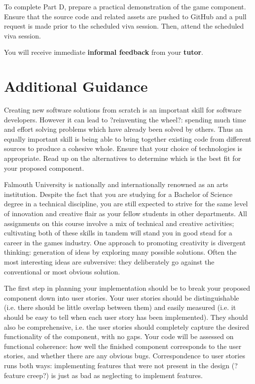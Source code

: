 \documentclass{../fal_assignment}
\begin{document}
To complete Part D, prepare a practical demonstration of the game component. Ensure that the source code and related assets are pushed to GitHub and a pull request is made prior to the scheduled viva session. Then, attend the scheduled viva session.

You will receive immediate \textbf{informal feedback} from your \textbf{tutor}.

\section*{Additional Guidance}

Creating new software solutions from scratch is an important skill for software developers. However it can lead to ?reinventing the wheel?: spending much time and effort solving problems which have already been solved by others. Thus an equally important skill is being able to bring together existing code from different sources to produce a cohesive whole. Ensure that your choice of technologies is appropriate. Read up on the alternatives to determine which is the best fit for your proposed component. 

Falmouth University is nationally and internationally renowned as an arts institution. Despite the fact that you are studying for a Bachelor of Science degree in a technical discipline, you are still expected to strive for the same level of innovation and creative flair as your fellow students in other departments. All assignments on this course involve a mix of technical and creative activities; cultivating both of these skills in tandem will stand you in good stead for a career in the games industry. One approach to promoting creativity is divergent thinking: generation of ideas by exploring many possible solutions. Often the most interesting ideas are subversive: they deliberately go against the conventional or most obvious solution. 

The first step in planning your implementation should be to break your proposed component down into user stories. Your user stories should be distinguishable (i.e. there should be little overlap between them) and easily measured (i.e. it should be easy to tell when each user story has been implemented). They should also be comprehensive, i.e. the user stories should completely capture the desired functionality of the component, with no gaps. Your code will be assessed on functional coherence: how well the finished component corresponds to the user stories, and whether there are any obvious bugs. Correspondence to user stories runs both ways: implementing features that were not present in the design (?feature creep?) is just as bad as neglecting to implement features. 
\end{document}
